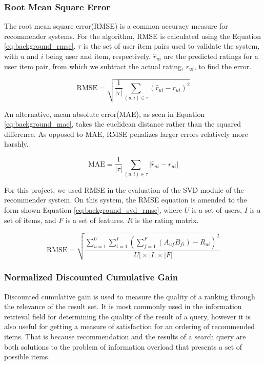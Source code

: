 \subsubsection{Root Mean Square Error}
The root mean square error(RMSE) is a common accuracy measure for recommender systems\cite{rmse}. For the algorithm, RMSE is calculated using the Equation \ref{eq:background_rmse}. $\tau$ is the set of user item pairs used to validate the system, with $u$ and $i$ being user and item, respectively. $\hat{r}_{ui}$ are the predicted ratings for a user item pair, from which we subtract the actual rating, $r_{ui}$, to find the error.

\begin{equation} \label{eq:background_rmse}
\text{RMSE} = \sqrt{\frac{1}{|\tau|}\sum_{(u,i)\in \tau}(\hat{r}_{ui}-r_{ui})^2}
\end{equation}

An alternative, mean absolute error(MAE), as seen in Equation \ref{eq:background_mae}, takes the euclidean distance rather than the squared difference\cite{rmse}. As opposed to MAE, RMSE penalizes larger errors relatively more harshly.

\begin{equation} \label{eq:background_mae}
\text{MAE} = \frac{1}{|\tau|}\sum_{(u,i)\in \tau}|\hat{r}_{ui}-r_{ui}|
\end{equation}

For this project, we used RMSE in the evaluation of the SVD module of the recommender system. On this system, the RMSE equation is amended to the form shown Equation \ref{eq:background_svd_rmse}, where $U$ is a set of users, $I$ is a set of items, and $F$ is a set of features. $R$ is the rating matrix.

\begin{equation}\label{eq:background_svd_rmse}
	\text{RMSE} = \sqrt{\frac{\sum_{u=1}^{U}\sum_{i=1}^{I}(\sum_{f=1}^{F}(A_{uf} B_{fi}) - R_{ui})^2}{|U|\times |I|\times |F|}}
\end{equation}

\subsubsection{Normalized Discounted Cumulative Gain}\label{sec:testandeval_ndcg}
Discounted cumulative gain is used to measure the quality of a ranking through the relevance of the result set. It is most commonly used in the information retrieval field for determining the quality of the result of a query, however it is also useful for getting a measure of satisfaction for an ordering of recommended items. That is because recommendation and the results of a search query are both solutions to the problem of information overload that presents a set of possible items\cite{ndcg}\cite{baltrunas}.

